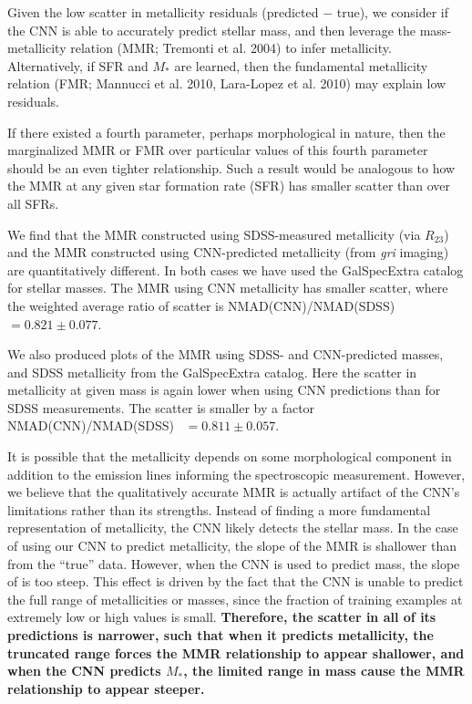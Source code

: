 \documentclass[fleqn,usenatbib]{mnras}
\begin{document}
Given the low scatter in metallicity residuals (predicted $-$ true), we consider if the CNN is able to accurately predict stellar mass, and then leverage the mass-metallicity relation (MMR; Tremonti et al. 2004) to infer metallicity.
Alternatively, if SFR and $M_*$ are learned, then the fundamental metallicity relation (FMR; Mannucci et al. 2010, Lara-Lopez et al. 2010) may explain low residuals.


If there existed a fourth parameter, perhaps morphological in nature, then the marginalized MMR or FMR over particular values of this fourth parameter should be an even tighter relationship.
Such a result would be analogous to how the MMR at any given star formation rate (SFR) has smaller scatter than over all SFRs.

We find that the MMR constructed using SDSS-measured metallicity (via $R_{23}$) and the MMR constructed using CNN-predicted metallicity (from \textit{gri} imaging) are quantitatively different.
In both cases we have used the GalSpecExtra catalog for stellar masses.
The MMR using CNN metallicity has smaller scatter, where the weighted average ratio of scatter is NMAD(CNN)/NMAD(SDSS)~$= 0.821 \pm 0.077$.


We also produced plots of the MMR using SDSS- and CNN-predicted masses, and SDSS metallicity from the GalSpecExtra catalog.
Here the scatter in metallicity at given mass is again lower when using CNN predictions than for SDSS measurements.
The scatter is smaller by a factor NMAD(CNN)/NMAD(SDSS)~ $= 0.811 \pm 0.057$.

It is possible that the metallicity depends on some morphological component in addition to the emission lines informing the spectroscopic measurement.
However, we believe that the qualitatively accurate MMR is actually artifact of the CNN's limitations rather than its strengths.
Instead of finding a more fundamental representation of metallicity, the CNN likely detects the stellar mass.
In the case of using our CNN to predict metallicity, the slope of the MMR is shallower than from the ``true'' data. 
However, when the CNN is used to predict mass, the slope of is too steep.
This effect is driven by the fact that the CNN is unable to predict the full range of metallicities or masses, since the fraction of training examples at extremely low or high values is small.
\textbf{Therefore, the scatter in all of its predictions is narrower, such that when it predicts metallicity, the truncated range forces the MMR relationship to appear shallower, and when the CNN predicts $M_*$, the limited range in mass cause the MMR relationship to appear steeper.}
\end{document}
